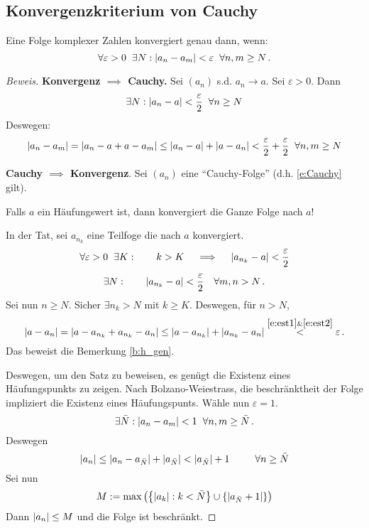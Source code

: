 \subsection{Konvergenzkriterium von Cauchy}
\begin{Sat}
  Eine Folge komplexer Zahlen konvergiert genau dann, wenn:
\begin{equation}\label{e:Cauchy}
\forall \varepsilon>0\hspace{2mm}\exists N:\mathopen| a_n-a_m \mathclose|<\varepsilon\hspace{2mm}\forall n,m\geq N\, .
\end{equation}
\end{Sat}

\begin{proof}[Beweis]
  {\bf Konvergenz $\implies$ Cauchy.} Sei $(a_n)$ s.d. 
$a_n\to a$. Sei $\varepsilon>0$. Dann 
  \[\exists N:\mathopen| a_n-a \mathclose|<\frac{\varepsilon}{2}\hspace{2mm}\forall n\geq N\]
Deswegen:
  \[\mathopen| a_n-a_m \mathclose|=\mathopen| a_n-a+a-a_m \mathclose|
\leq \mathopen| a_n-a \mathclose|+\mathopen| a-a_n \mathclose|<\frac{\varepsilon}{2}
+\frac{\varepsilon}{2}\hspace{2mm}\forall n,m\geq N\]

\medskip

{\bf Cauchy $\implies$ Konvergenz}. Sei $(a_n)$ eine ``Cauchy-Folge''
(d.h. \eqref{e:Cauchy} gilt).   
\begin{Bem}\label{b:h_gen}
Falls $a$ ein Häufungswert ist, dann konvergiert die Ganze Folge nach $a$! 
\end{Bem}
In der Tat, sei $a_{n_k}$ eine Teilfoge die nach $a$ konvergiert.
\begin{equation}\label{e:est1}
\forall \varepsilon>0\hspace{2mm}\exists K:\qquad 
k>K \quad \implies\quad \mathopen| a_{n_k}-a \mathclose|<\frac{\varepsilon}{2}
\end{equation}
\begin{equation}\label{e:est2}
\exists N: \qquad \mathopen| a_{n_k}-a \mathclose|<\frac{\varepsilon}{2}\quad \forall m,n>N\, .
\end{equation}
  Sei nun $n\geq N$. 
Sicher $\exists n_k>N$ mit $k\geq K$. Deswegen, f\"ur $n>N$,
  \[\mathopen| a-a_n \mathclose|=\mathopen| a-a_{n_k}+a_{n_k}-a_n \mathclose|
\leq\mathopen| a-a_{n_k} \mathclose|+\mathopen| a_{n_k}-a_n \mathclose|\stackrel{\eqref{e:est1} \&
\eqref{e:est2}}{<} \varepsilon\, .\]
Das beweist die Bemerkung \ref{b:h_gen}.

Deswegen, um den Satz zu beweisen, es gen\"ugt die Existenz
eines H\"aufungspunkts zu zeigen. Nach Bolzano-Weiestrass,
die beschr\"anktheit der Folge impliziert die Existenz eines
H\"aufungspunts. Wähle nun $\varepsilon=1$. 
  \[\exists \bar N:\mathopen| a_n-a_m \mathclose|<1\hspace{2mm}\forall n,m\geq \bar N\, .\]
Deswegen
\[\mathopen| a_n \mathclose|\leq \mathopen| a_n-a_{\bar N} \mathclose|+\mathopen| a_{\bar N} \mathclose|<\mathopen| a_{\bar N} \mathclose|+1\hspace{2mm}
\qquad\forall n
\geq \bar N\]
Sei nun
\[M:=\max\left( \left\{ \mathopen| a_k \mathclose|:k<\bar N \right\}\cup\left\{ \mathopen| a_{\bar N}+1 \mathclose| 
\right\} \right)\]
Dann $\mathopen| a_n \mathclose|\leq M$ und die Folge ist beschr\"ankt.
\end{proof}
